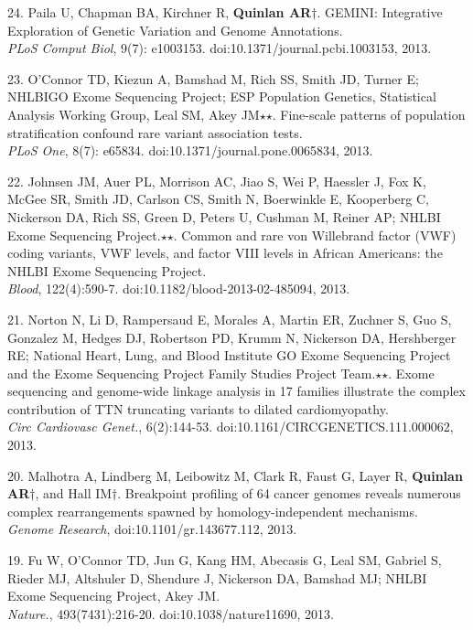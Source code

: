 \documentclass[margin,line]{cv}
\begin{document}
\begin{resume}
\begin{list}{*}{}
    \item[24.] Paila U, Chapman BA, Kirchner R, \textbf{Quinlan AR}$\dagger$.
    GEMINI: Integrative Exploration of Genetic Variation and Genome Annotations.\\
    \emph{PLoS Comput Biol}, 9(7): e1003153. doi:10.1371/journal.pcbi.1003153, 2013.

    \item[23.] O'Connor TD, Kiezun A, Bamshad M, Rich SS, Smith JD, Turner E; NHLBIGO Exome Sequencing Project; ESP Population Genetics, Statistical Analysis Working Group, Leal SM, Akey JM$\star$$\star$. Fine-scale patterns of population stratification confound rare variant association tests.\\
    \emph{PLoS One}, 8(7): e65834. doi:10.1371/journal.pone.0065834, 2013.

    \item[22.] Johnsen JM, Auer PL, Morrison AC, Jiao S, Wei P, Haessler J, Fox K, McGee SR, Smith JD, Carlson CS, Smith N, Boerwinkle E, Kooperberg C, Nickerson DA, Rich SS, Green D, Peters U, Cushman M, Reiner AP; NHLBI Exome Sequencing Project.$\star$$\star$. Common and rare von Willebrand factor (VWF) coding variants, VWF levels, and factor VIII levels in African Americans: the NHLBI Exome Sequencing Project.\\
    \emph{Blood}, 122(4):590-7. doi:10.1182/blood-2013-02-485094, 2013.

    \item[21.] Norton N, Li D, Rampersaud E, Morales A, Martin ER, Zuchner S, Guo S, Gonzalez M, Hedges DJ, Robertson PD, Krumm N, Nickerson DA, Hershberger RE; National Heart, Lung, and Blood Institute GO Exome Sequencing Project and the Exome Sequencing Project Family Studies Project Team.$\star$$\star$. Exome sequencing and genome-wide linkage analysis in 17 families illustrate the complex contribution of TTN truncating variants to dilated cardiomyopathy.\\
    \emph{Circ Cardiovasc Genet.}, 6(2):144-53. doi:10.1161/CIRCGENETICS.111.000062, 2013.
	
    \item[20.] Malhotra A, Lindberg M, Leibowitz M, Clark R, Faust G, Layer R, \textbf{Quinlan AR}$\dagger$, and Hall IM$\dagger$.
    Breakpoint profiling of 64 cancer genomes reveals numerous complex rearrangements spawned by homology-independent mechanisms. \\
    \emph{Genome Research}, doi:10.1101/gr.143677.112, 2013.

    \item[19.] Fu W, O'Connor TD, Jun G, Kang HM, Abecasis G, Leal SM, Gabriel S, Rieder MJ, Altshuler D, Shendure J, Nickerson DA, Bamshad MJ; NHLBI Exome Sequencing Project, Akey JM.\\
    \emph{Nature.}, 493(7431):216-20. doi:10.1038/nature11690, 2013.
	

\end{list}
\end{resume}
\end{document}
